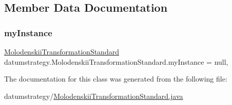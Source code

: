 \subsection{Member Data Documentation}
\mbox{\label{classdatumstrategy_1_1_molodenskii_transformation_standard_adf5e42e21481a8c9d0f3f70606ccbbbd}} 
\subsubsection{\texorpdfstring{my\+Instance}{myInstance}}
{\footnotesize\ttfamily \hyperlink{classdatumstrategy_1_1_molodenskii_transformation_standard}{Molodenskii\+Transformation\+Standard} datumstrategy.\+Molodenskii\+Transformation\+Standard.\+my\+Instance = null\hspace{0.3cm}{\ttfamily [static]}, {\ttfamily [private]}}



The documentation for this class was generated from the following file\+:\begin{DoxyCompactItemize}
\item 
datumstrategy/\hyperlink{_molodenskii_transformation_standard_8java}{Molodenskii\+Transformation\+Standard.\+java}\end{DoxyCompactItemize}
